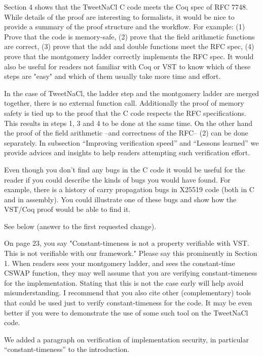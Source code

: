 Section 4 shows that the TweetNaCl C code meets the Coq spec of RFC 7748. While details of the proof are interesting to formalists, it would be nice to provide a summary of the proof structure and the workflow. For example: (1) Prove that the code is memory-safe, (2) prove that the field arithmetic functions are correct, (3) prove that the add and double functions meet the RFC spec, (4) prove that the montgomery ladder correctly implements the RFC spec. It would also be useful for readers not familiar with Coq or VST to know which of these steps are "easy" and which of them usually take more time and effort.
\begin{answer}
  In the case of TweetNaCl, the ladder step and the montgomery ladder are merged together, there is no external function call. Additionally the proof of memory safety is tied up to the proof that the C code respects the RFC specifications. This results in steps 1, 3 and 4 to be done at the same time. On the other hand the proof of the field arithmetic --and correctness of the RFC-- (2) can be done separately. In subsection ``Improving verification speed'' and ``Lessons learned'' we provide advices and insights to help readers attempting such verification effort.
\end{answer}

Even though you don't find any bugs in the C code it would be useful for the reader if you could describe the kinds of bugs you would have found. For example, there is a history of carry propagation bugs in X25519 code (both in C and in assembly). You could illustrate one of these bugs and show how the VST/Coq proof would be able to find it.
\begin{answer}
  See below (answer to the first requested change).
\end{answer}

On page 23, you say "Constant-timeness is not a property verifiable with VST. This is not verifiable with our framework." Please say this prominently in Section 1. When readers sees your montgomery ladder, and sees the constant-time CSWAP function, they may well assume that you are verifying constant-timeness for the implementation. Stating that this is not the case early will help avoid misunderstanding. I recommend that you also cite other (complementary) tools that could be used just to verify constant-timeness for the code. It may be even better if you were to demonstrate the use of some such tool on the TweetNaCl code.
\begin{answer}
  We added a paragraph on verification of implementation security, in particular ``constant-timeness'' to the introduction.
\end{answer}

